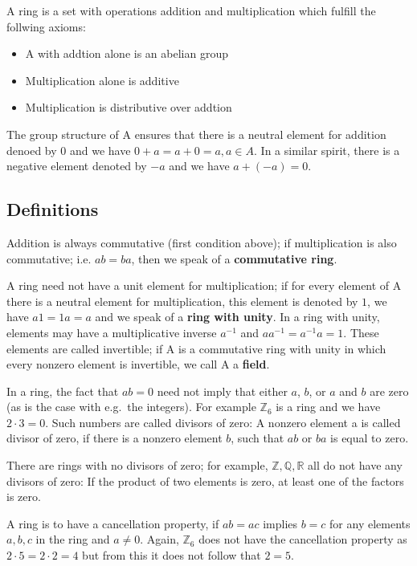 
A ring is a set with operations addition and multiplication which
fulfill the follwing axioms:

\begin{itemize}
\item
  A with addtion alone is an abelian group
\item
  Multiplication alone is additive
\item
  Multiplication is distributive over addtion
\end{itemize}

The group structure of A ensures that there is a neutral element for
addition denoed by 0 and we have \(0 + a = a + 0 = a, a \in A\). In a
similar spirit, there is a negative element denoted by \(-a\) and we
have \(a + (-a) = 0\).

\subsection{Definitions}\label{definitions}

Addition is always commutative (first condition above); if
multiplication is also commutative; i.e. \(ab = ba\), then we speak of a
\textbf{commutative ring}.

A ring need not have a unit element for multiplication; if for every
element of A there is a neutral element for multiplication, this element
is denoted by \(1\), we have \(a1 = 1a = a\) and we speak of a
\textbf{ring with unity}. In a ring with unity, elements may have a
multiplicative inverse \(a^{-1}\) and \(a a^{-1} = a^{-1} a = 1\). These
elements are called invertible; if A is a commutative ring with unity in
which every nonzero element is invertible, we call A a \textbf{field}.

In a ring, the fact that \(ab = 0\) need not imply that either \(a\),
\(b\), or \(a\) and \(b\) are zero (as is the case with e.g.~the
integers). For example \(\mathbb{Z}_6\) is a ring and we have
\(2 \cdot 3 = 0\). Such numbers are called divisors of zero: A nonzero
element a is called divisor of zero, if there is a nonzero element
\(b\), such that \(ab\) or \(ba\) is equal to zero.

There are rings with no divisors of zero; for example,
\(\mathbb{Z}, \mathbb{Q}, \mathbb{R}\) all do not have any divisors of
zero: If the product of two elements is zero, at least one of the
factors is zero.

A ring is to have a cancellation property, if \(ab = ac\) implies
\(b=c\) for any elements \(a,b,c\) in the ring and \(a \neq 0\). Again,
\(\mathbb{Z}_6\) does not have the cancellation property as
\(2 \cdot 5 = 2 \cdot 2 = 4\) but from this it does not follow that
\(2 = 5\).

